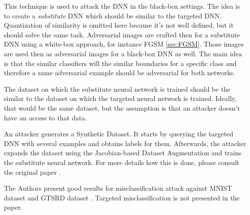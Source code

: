 This technique is used to attack the DNN in the black-box settings. The idea is to create a \textit{substitute} DNN which should be similar to the targeted DNN. Quantization of similarity is omitted here because it's not well defined, but it should solve the same task.  Adversarial images are crafted then for a substitute DNN using a white-box approach, for instance FGSM \ref{sec:FGSM}. Those images are used then as adversarial images for a black-box DNN as well. The main idea is that the similar classifiers will the similar boundaries for a specific class and therefore a same adversarial example should be adversarial for both networks. 

The dataset on which the substitute neural network is trained should be the similar to the dataset on which the targeted neural network is trained. Ideally, that would be the same dataset, but the assumption is that an attacker doesn't have an access to that data. 

An attacker generates a Synthetic Dataset. It starts by querying the targeted DNN with several examples and obtains labels for them. Afterwards, the attacker expands the dataset using the Jacobian-based Dataset Augmentation and trains the substitute neural network. For more details how this is done, please consult the original paper  \citep{DBLP:journals/corr/PapernotMGJCS16}.


The Authors present good results for misclassification attack against MNIST dataset and GTSRD dataset \cite{datasetGTSRD}. Targeted misclassification is not presented in the paper.